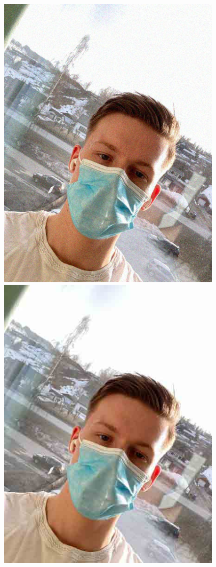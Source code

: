 \begin{figure}[H]
    \subfloat
        {\includegraphics[scale = 0.13]{figures/0718noise.jpg}}
    \subfloat
        {\includegraphics[scale = 0.13]{figures/0718photoshop_compression.jpg}}

\end{figure}
